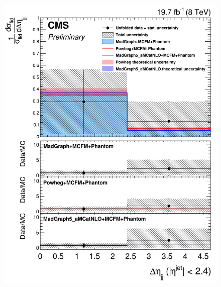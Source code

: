 \begin{figure}[hbtp]
\begin{center}
    \includegraphics[width=\cmsFigWidth]{Figures/DiffCrossSecZZTo4eCentralDeta_Unfolded_fr_MadGraph_norm.png}     

\end{center}
\end{figure}
